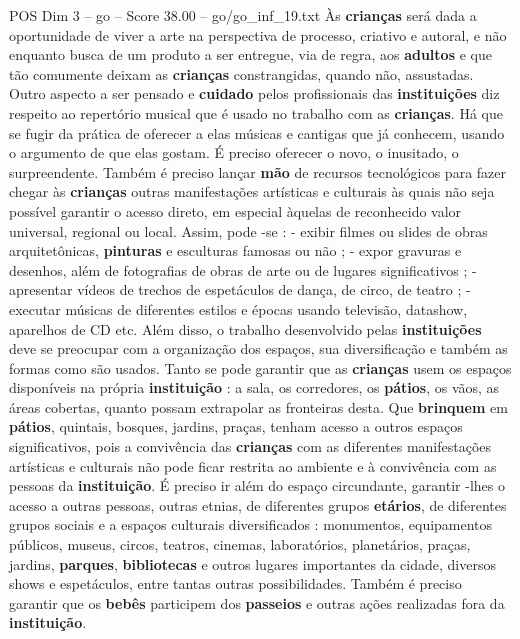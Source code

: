 \begin{textsample}{POS Dim 3 – go – Score 38.00 – go/go\_inf\_19.txt}
Às \textbf{crianças} será dada a oportunidade de viver a arte na perspectiva de processo, criativo e autoral, e não enquanto busca de um produto a ser entregue, via de regra, aos \textbf{adultos} e que tão comumente deixam as \textbf{crianças} constrangidas, quando não, assustadas.
Outro aspecto a ser pensado e \textbf{cuidado} pelos profissionais das \textbf{instituições} diz respeito ao repertório musical que é usado no trabalho com as \textbf{crianças}.
Há que se fugir da prática de oferecer a elas músicas e cantigas que já conhecem, usando o argumento de que elas gostam.
É preciso oferecer o novo, o inusitado, o surpreendente.
Também é preciso lançar \textbf{mão} de recursos tecnológicos para fazer chegar às \textbf{crianças} outras manifestações artísticas e culturais às quais não seja possível garantir o acesso direto, em especial àquelas de reconhecido valor universal, regional ou local.
Assim, pode -se : - exibir filmes ou slides de obras arquitetônicas, \textbf{pinturas} e esculturas famosas ou não ; - expor gravuras e desenhos, além de fotografias de obras de arte ou de lugares significativos ; - apresentar vídeos de trechos de espetáculos de dança, de circo, de teatro ; - executar músicas de diferentes estilos e épocas usando televisão, datashow, aparelhos de CD etc.
Além disso, o trabalho desenvolvido pelas \textbf{instituições} deve se preocupar com a organização dos espaços, sua diversificação e também as formas como são usados.
Tanto se pode garantir que as \textbf{crianças} usem os espaços disponíveis na própria \textbf{instituição} : a sala, os corredores, os \textbf{pátios}, os vãos, as áreas cobertas, quanto possam extrapolar as fronteiras desta.
Que \textbf{brinquem} em \textbf{pátios}, quintais, bosques, jardins, praças, tenham acesso a outros espaços significativos, pois a convivência das \textbf{crianças} com as diferentes manifestações artísticas e culturais não pode ficar restrita ao ambiente e à convivência com as pessoas da \textbf{instituição}.
É preciso ir além do espaço circundante, garantir -lhes o acesso a outras pessoas, outras etnias, de diferentes grupos \textbf{etários}, de diferentes grupos sociais e a espaços culturais diversificados : monumentos, equipamentos públicos, museus, circos, teatros, cinemas, laboratórios, planetários, praças, jardins, \textbf{parques}, \textbf{bibliotecas} e outros lugares importantes da cidade, diversos shows e espetáculos, entre tantas outras possibilidades.
Também é preciso garantir que os \textbf{bebês} participem dos \textbf{passeios} e outras ações realizadas fora da \textbf{instituição}.

\end{textsample}
